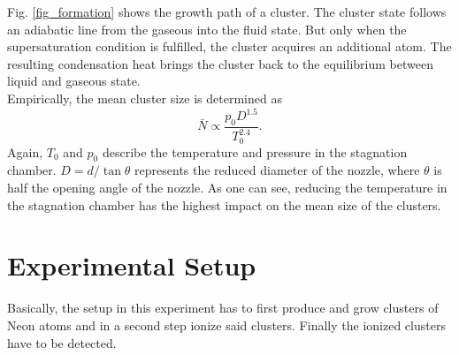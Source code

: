 \documentclass[a4paper,10pt]{article}
\begin{document}
Fig. \ref{fig_formation} shows the growth path of a cluster. The cluster state follows an adiabatic line from the gaseous into the fluid state. But only when the supersaturation condition is fulfilled, the cluster acquires an additional atom. The resulting condensation heat brings the cluster back to the equilibrium between liquid and gaseous state. \\
Empirically, the mean cluster size is determined as
\begin{equation}
	\bar{N} \propto \frac{p_0 D^{1.5}}{T_0^{2.4}}.
\end{equation}
Again, $T_0$ and $p_0$ describe the temperature and pressure in the stagnation chamber. $D = d / \tan \theta$ represents the reduced diameter of the nozzle, where $\theta$ is half the opening angle of the nozzle. As one can see, reducing the temperature in the stagnation chamber has the highest impact on the mean size of the clusters.

\section{Experimental Setup}
Basically, the setup in this experiment has to first produce and grow clusters of Neon atoms and in a second step ionize said clusters. Finally the ionized clusters have to be detected.
\end{document}
